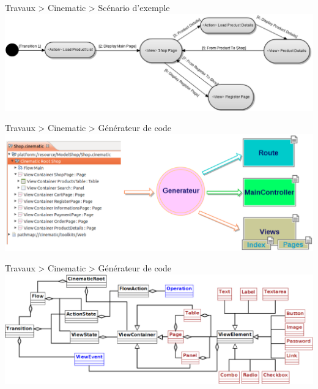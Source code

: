 \documentclass[HeilHazel,pdf,final,colorBG,slideColor]{prosper}
\begin{document}
\begin{slide}{Travaux > Cinematic > Scénario d'exemple}
  \bc{} 
    \includegraphics[scale=.25]{img/cinematic_act.eps} 
  \ec{}
\end{slide}

\begin{slide}{Travaux > Cinematic > Générateur de code}
    \includegraphics[scale=.3]{img/cinematic_gen.eps} 
\end{slide}


\begin{slide}{Travaux > Cinematic > Générateur de code}
    \bi
    \ei
    \includegraphics[scale=.3]{img/cinematic_exp2.eps} 
\end{slide}
\end{document}
